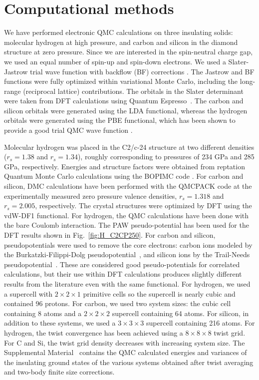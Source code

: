 \section{Computational methods\label{sec:bg-methods}}

We have performed electronic QMC calculations on three insulating solids:
molecular hydrogen at high pressure,
and carbon and silicon in the diamond structure at zero pressure. Since we are interested in the
spin-neutral charge gap, we used an equal number of spin-up and spin-down electrons. We used a Slater-Jastrow  trial wave function with backflow (BF) corrections \cite{Holzmann2003,Trial}. The Jastrow and BF functions were fully optimized within variational Monte Carlo, including the long-range (reciprocal lattice) contributions.
The orbitals in the Slater determinant were taken from DFT calculations using Quantum Espresso~\cite{QE2009, QE2017}. The carbon and silicon orbitals were generated using the LDA functional, whereas the hydrogen orbitals were generated using the PBE functional, which has been shown to provide a good trial QMC wave function \cite{Morales2012,Pierleoni2016}.

Molecular hydrogen was placed in the C2/c-24 structure \cite{Pickard2007} at two different densities ($r_s=1.38$ and $r_s=1.34$), roughly corresponding to pressures of 234 GPa and 285 GPa, respectively.
Energies and structure factors were obtained from reptation Quantum Monte Carlo calculations using the BOPIMC code \cite{BOPIMC}. For carbon and silicon, DMC calculations have been performed with the QMCPACK code \cite{QMCPACK}
at the experimentally measured zero pressure valence densities, $r_s=1.318$ and $r_s=2.005$, respectively.
The crystal structures were optimized by DFT using the vdW-DF1 functional.
For hydrogen, the QMC calculations have been done with the bare Coulomb interaction. The PAW pseudo-potential has been used for the DFT results shown in Fig.~\ref{fig:H_C2CP250}. For carbon and silicon, pseudopotentials were used to remove the core electrons: carbon ions modeled by the Burkatzki-Filippi-Dolg pseudopotential~\cite{Burkatzki2007}, and silicon ions by the Trail-Needs pseudopotential~\cite{Trail2005}. These are considered good pseudo-potentials for correlated calculations, but their use within DFT calculations produces slightly different results from the literature even with the same functional.
For hydrogen, we used a supercell with  $2 \times 2 \times 1$ primitive cells so the supercell is nearly cubic and contained 96 protons. For carbon, we used two system sizes: the cubic cell containing 8 atoms and a $2\times 2\times 2$ supercell containing 64 atoms. For silicon, in addition to these systems, we used a $3\times 3\times 3$ supercell containing 216 atoms.
For hydrogen, the twist convergence has been achieved using a $8 \times 8 \times 8$ twist grid. For C and Si, the twist grid density decreases with increasing system size. The Supplemental Material~\cite{supp} contains the QMC calculated energies and variances of the insulating ground states
of the various systems obtained after twist averaging and two-body finite size corrections.

